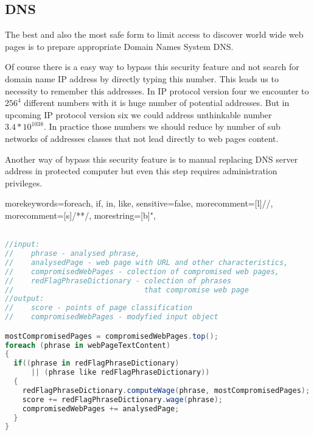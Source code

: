 \documentclass[9pt,a4paper]{extarticle}
\begin{document}
\begin{multicols}{2}
\section{DNS}
The best and also the most safe form to limit access to discover world wide web pages is to prepare appropriate Domain Names System DNS\cite{j._postel_domain_1984, p._mockapetris_domain_1987, p._mockapetris_domain2_1987, yakov_rekhter_dynamic_1997, r._elz_clarifications_1997, d._eastlake_domain_1999}.

Of course there is a easy way to bypass this security feature and not search for domain name IP address by directly typing this number. This leads us to necessity to remember this addresses. In IP protocol version four we encounter to \({256}^{4}\) different numbers with it is huge number of potential addresses. But in upcoming IP protocol version six we could address unthinkable number \(3.4*10^{1038}\). In practice those numbers we should reduce by number of sub networks of addresses classes that not lead directly to web pages content.

Another way of bypass this security feature is to manual replacing DNS server address in protected computer but even this step requires administration privileges.

\end{multicols}

%
 {morekeywords={foreach, if, in, like}, sensitive=false, morecomment=[l]{//}, morecomment=[s]{/*}{*/}, morestring=[b]", }
\lstset{
numbers=left, numberstyle=\tiny, stepnumber=1, numbersep=5pt
}
\begin{lstlisting}[title={Alg 1. The basic Internet web page classifier algorithm}, language=csharp, label=alg1] 

//input: 
//    phrase - analysed phrase, 
//    analysedPage - web page with URL and other characteristics, 
//    compromisedWebPages - colection of compromised web pages, 
//    redFlagPhraseDictionary - colection of phrases 
//                              that compromise web page
//output:
//    score - points of page classification
//    compromisedWebPages - modyfied input object

mostCompromisedPages = compromisedWebPages.top();
foreach (phrase in webPageTextContent)
{  
  if((phrase in redFlagPhraseDictionary) 
      || (phrase like redFlagPhraseDictionary))
  {
    redFlagPhraseDictionary.computeWage(phrase, mostCompromisedPages);
    score += redFlagPhraseDictionary.wage(phrase);
    compromisedWebPages += analysedPage;
  }
}
\end{lstlisting}
\end{document}
